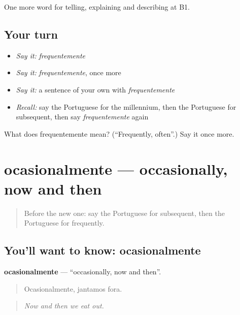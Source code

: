 \begin{grammarlens}[title={What you've built}]
One more word for telling, explaining and describing at B1.
\end{grammarlens}

\subsection*{Your turn}
\begin{itemize}
\raggedright
  \item \emph{Say it:} \emph{frequentemente}
  \item \emph{Say it:} \emph{frequentemente}, once more
  \item \emph{Say it:} a sentence of your own with \emph{frequentemente}
  \item \emph{Recall:} say the Portuguese for the millennium, then the Portuguese for subsequent, then say \emph{frequentemente} again
\end{itemize}

\begin{tcolorbox}[breakable,colback=teal!4,colframe=teal!35!black,title={Before you move on}]
What does frequentemente mean? (\textquotedblleft{}Frequently, often\textquotedblright{}.) Say it once more.
\end{tcolorbox}
\section[ocasionalmente]{ocasionalmente — occasionally, now and then}

\label{lesson:PT-C277-ocasionalmente}



\begin{quote}
Before the new one: say the Portuguese for subsequent, then the Portuguese for frequently.
\end{quote}

\subsection*{You'll want to know: ocasionalmente}
\textbf{ocasionalmente} — \textquotedblleft{}occasionally, now and then\textquotedblright{}.

\begin{quote}
Ocasionalmente, jantamos fora.
\end{quote}

\begin{quote}
\emph{Now and then we eat out.}
\end{quote}

